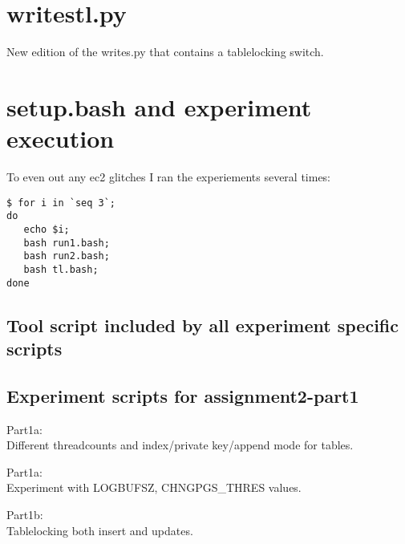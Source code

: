 \section{writestl.py}\label{app:tl}
New edition of the writes.py that contains a tablelocking switch.


\section{setup.bash and experiment execution}\label{app:setup}
To even out any ec2 glitches I ran the experiements several times:
\begin{verbatim}
$ for i in `seq 3`; 
do 
   echo $i; 
   bash run1.bash; 
   bash run2.bash; 
   bash tl.bash; 
done
\end{verbatim}

\subsection{Tool script included by all experiment specific scripts}


\subsection{Experiment scripts for assignment2-part1}

Part1a:\\
Different threadcounts and index/private key/append mode for tables.

Part1a:\\
Experiment with LOGBUFSZ, CHNGPGS\_THRES values.

Part1b:\\
Tablelocking both insert and updates.




